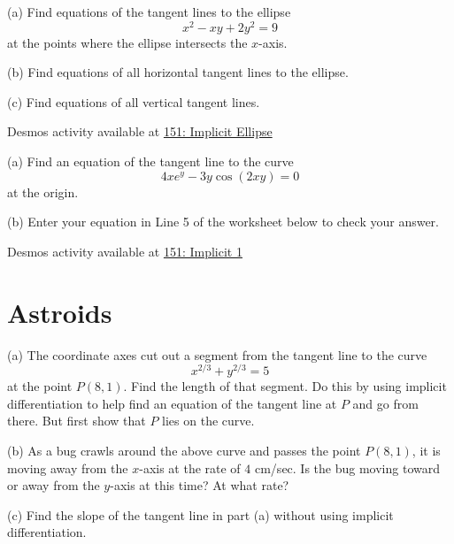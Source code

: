 \documentclass{ximera}
\begin{document}
\begin{question}  \label{Q:(dfdst43mmm}
(a) Find equations of the tangent lines to the ellipse
\[
       x^2 - xy + 2y^2 = 9
\] 
at the points where the ellipse intersects the $x$-axis.

(b) Find equations of all horizontal tangent lines to the ellipse.

(c) Find equations of all vertical tangent lines.

\begin{onlineOnly}
    \begin{center}
\end{center}
\end{onlineOnly}

Desmos activity available at \href{https://www.desmos.com/calculator/ox3wvfitqk}{151: Implicit Ellipse}

\end{question}

\begin{question}  \label{Q:KKmbVC}
(a) Find an equation of the tangent line to the curve
\[
     4xe^y - 3y \cos(2xy)=0
\]
at the origin.

(b) Enter your equation in Line 5 of the worksheet below to check your answer.

\begin{onlineOnly}
    \begin{center}
\end{center}
\end{onlineOnly}

Desmos activity available at \href{https://www.desmos.com/calculator/1qprxg226m}{151: Implicit 1}

\end{question}




\section*{Astroids}


\begin{question}  \label{QPDDFDFgg}
(a) The coordinate axes cut out a segment from the tangent line to the curve
\[
     x^{2/3} + y^{2/3}= 5
\]
at the point $P(8,1)$. Find the length of that segment. Do this by using implicit differentiation to help find an equation of the tangent line at $P$ and go from there. But first show that $P$ lies on the curve.

(b) As a bug crawls around the above curve and passes the point $P(8,1)$, it is moving away from the $x$-axis at the rate of $4$ cm/sec. Is the bug moving toward or away from the $y$-axis at this time? At what rate?  

(c) Find the slope of the tangent line in part (a) without using implicit differentiation.




\end{question}
\end{document}
